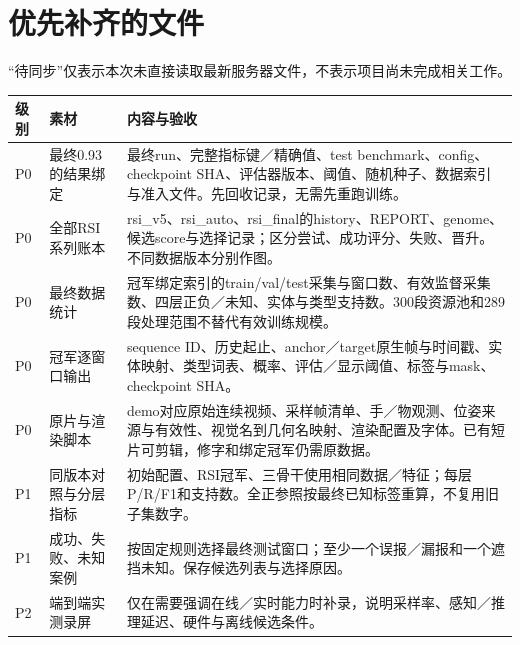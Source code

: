 \documentclass[11pt,a4paper]{ctexart}
\begin{document}
\section{优先补齐的文件}
“待同步”仅表示本次未直接读取最新服务器文件，不表示项目尚未完成相关工作。
\begin{longtable}{L{.9cm}L{3.3cm}L{10.1cm}}
\toprule 级别 & 素材 & 内容与验收\\\midrule\endhead
P0 & 最终0.93的结果绑定 & 最终run、完整指标键／精确值、test benchmark、config、checkpoint SHA、评估器版本、阈值、随机种子、数据索引与准入文件。先回收记录，无需先重跑训练。\\
P0 & 全部RSI系列账本 & rsi\_v5、rsi\_auto、rsi\_final的history、REPORT、genome、候选score与选择记录；区分尝试、成功评分、失败、晋升。不同数据版本分别作图。\\
P0 & 最终数据统计 & 冠军绑定索引的train/val/test采集与窗口数、有效监督采集数、四层正负／未知、实体与类型支持数。300段资源池和289段处理范围不替代有效训练规模。\\
P0 & 冠军逐窗口输出 & sequence ID、历史起止、anchor／target原生帧与时间戳、实体映射、类型词表、概率、评估／显示阈值、标签与mask、checkpoint SHA。\\
P0 & 原片与渲染脚本 & demo对应原始连续视频、采样帧清单、手／物观测、位姿来源与有效性、视觉名到几何名映射、渲染配置及字体。已有短片可剪辑，修字和绑定冠军仍需原数据。\\
P1 & 同版本对照与分层指标 & 初始配置、RSI冠军、三骨干使用相同数据／特征；每层P/R/F1和支持数。全正参照按最终已知标签重算，不复用旧子集数字。\\
P1 & 成功、失败、未知案例 & 按固定规则选择最终测试窗口；至少一个误报／漏报和一个遮挡未知。保存候选列表与选择原因。\\
P2 & 端到端实测录屏 & 仅在需要强调在线／实时能力时补录，说明采样率、感知／推理延迟、硬件与离线候选条件。\\\bottomrule
\end{longtable}
\end{document}
